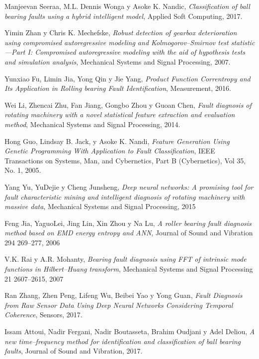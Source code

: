 \documentclass[12pt]{article}%
\begin{document}
\clearpage

\begin{thebibliography}{9}
Manjeevan Seeraa, M.L. Dennis Wonga y Asoke K. Nandic, \textit{Classification of ball bearing faults using a hybrid intelligent model}, Applied Soft Computing, 2017.

Yimin Zhan y Chris K. Mechefske, \textit{Robust detection of gearbox deterioration using compromised
autoregressive modeling and Kolmogorov–Smirnov test statistic—Part I: Compromised autoregressive modeling with the
aid of hypothesis tests and simulation analysis}, Mechanical Systems and Signal Processing, 2007.

Yunxiao Fu, Limin Jia, Yong Qin y Jie Yang, \textit{Product Function Correntropy and Its Application in Rolling bearing Fault Identification}, Measurement, 2016.

Wei Li, Zhencai Zhu, Fan Jiang, Gongbo Zhou y Guoan Chen, \textit{Fault diagnosis of rotating machinery with a novel statistical feature extraction and evaluation method}, Mechanical Systems and Signal Processing, 2014.

Hong Guo, Lindsay B. Jack, y Asoke K. Nandi, \textit{Feature Generation Using Genetic Programming With Application to Fault Classification}, IEEE Transactions on Systems, Man, and Cybernetics, Part B (Cybernetics), Vol 35, No. 1, 2005.

Yang Yu, YuDejie y Cheng Junsheng, \textit{Deep neural networks: A promising tool for fault characteristic mining and intelligent diagnosis of rotating machinery with massive data}, Mechanical Systems and Signal Processing, 2015

Feng Jia, YaguoLei, Jing Lin, Xin Zhou y Na Lu, \textit{A roller bearing fault diagnosis method based
on EMD energy entropy and ANN}, Journal of Sound and Vibration 294 269–277, 2006

V.K. Rai y A.R. Mohanty, \textit{Bearing fault diagnosis using FFT of intrinsic mode functions in Hilbert–Huang transform}, Mechanical Systems and Signal Processing 21 2607–2615, 2007

Ran Zhang, Zhen Peng, Lifeng Wu, Beibei Yao y Yong Guan, \textit{Fault Diagnosis from Raw Sensor Data Using Deep Neural Networks Considering Temporal Coherence}, Sensors, 2017.

Issam Attoui, Nadir Fergani, Nadir Boutasseta, Brahim Oudjani y Adel Deliou, \textit{A new time–frequency method for identification and classification of ball bearing faults}, Journal of Sound and Vibration, 2017.


\end{thebibliography}
\end{document}
